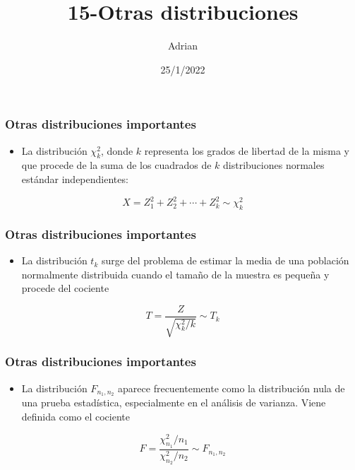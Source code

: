 \documentclass[
]{article}
\title{15-Otras distribuciones}
\author{Adrian}
\date{25/1/2022}
\providecommand{\tightlist}{%
  \setlength{\itemsep}{0pt}\setlength{\parskip}{0pt}}
\begin{document}
\maketitle

\hypertarget{otras-distribuciones-importantes}{%
\subsubsection{Otras distribuciones
importantes}\label{otras-distribuciones-importantes}}

\begin{itemize}
\tightlist
\item
  La distribución \(\chi^2_k\), donde \(k\) representa los grados de
  libertad de la misma y que procede de la suma de los cuadrados de
  \(k\) distribuciones normales estándar independientes:
\end{itemize}

\[X = Z_1^2 + Z_2^2+\cdots + Z_k^2\sim \chi_k^2\]

\hypertarget{otras-distribuciones-importantes-1}{%
\subsubsection{Otras distribuciones
importantes}\label{otras-distribuciones-importantes-1}}

\begin{itemize}
\tightlist
\item
  La distribución \(t_k\) surge del problema de estimar la media de una
  población normalmente distribuida cuando el tamaño de la muestra es
  pequeña y procede del cociente
\end{itemize}

\[T = \frac{Z}{\sqrt{\chi^2_k/k}}\sim T_k\]

\hypertarget{otras-distribuciones-importantes-2}{%
\subsubsection{Otras distribuciones
importantes}\label{otras-distribuciones-importantes-2}}

\begin{itemize}
\tightlist
\item
  La distribución \(F_{n_1,n_2}\) aparece frecuentemente como la
  distribución nula de una prueba estadística, especialmente en el
  análisis de varianza. Viene definida como el cociente
\end{itemize}

\[F = \frac{\chi^2_{n_1}/n_1}{\chi^2_{n_2}/n_2}\sim F_{n_1,n_2}\]
\end{document}
